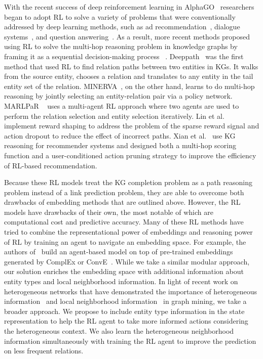 With the recent success of deep reinforcement learning in AlphaGO~\cite{silver2016mastering} researchers began to adopt RL to solve a variety of problems that were conventionally addressed by deep learning methods, such as ad recommendation~\cite{zheng2018drn,liu2018deep,chen2019top}, dialogue systems~\cite{serban2017deep,peng2017composite}, and question answering~\cite{xiong2017deeppath,das2017go}.  As a result, more recent methods proposed using RL to solve the multi-hop reasoning problem in knowledge graphs by framing it as a sequential decision-making process ~\cite{das2017go,shen2018reinforcewalk,xiong2017deeppath,shen2018m,li2018path,lin2018multi}. Deeppath~\cite{xiong2017deeppath} was the first method that used RL to find relation paths between two entities in KGs. It walks from the source entity, chooses a relation and translates to any entity in the tail entity set of the relation. MINERVA~\cite{das2017go}, on the other hand, learns to do multi-hop reasoning by jointly selecting an entity-relation pair via a policy network. MARLPaR ~\cite{li2018path} uses a multi-agent RL approach where two agents are used to perform the relation selection and entity selection iteratively. Lin et al. ~\cite{lin2018multi} implement reward shaping to address the problem of the sparse reward signal and action dropout to reduce the effect of incorrect paths. Xian et al.~\cite{xian2019reinforcement} use KG reasoning for recommender systems and designed both a multi-hop scoring function and a user-conditioned action pruning strategy to improve the efficiency of RL-based recommendation. 

Because these RL models treat the KG completion problem as a path reasoning problem instead of a link prediction problem, they are able to overcome both drawbacks of embedding methods that are outlined above. However, the RL models have drawbacks of their own, the most notable of which are computational cost and predictive accuracy. Many of these RL methods have tried to combine the representational power of embeddings and reasoning power of RL by training an agent to navigate an embedding space. For example, the authors of~\cite{lin2018multi} build an agent-based model on top of pre-trained embeddings generated by ComplEx\cite{trouillon2016complex} or ConvE~\cite{dettmers2018convolutional}. While we take a similar modular approach, our solution enriches the embedding space with additional information about entity types and local neighborhood information. 
In light of recent work on heterogeneous networks that have demonstrated the importance of heterogeneous information~\cite{dong2017metapath2vec,zhang2020learning,shen2020modeling,lei2019path} and local neighborhood information~\cite{xiong2018one,zhang2019few} in graph mining, we take a broader approach. We propose to include entity type information in the state representation to help the RL agent to take more informed actions considering the heterogeneous context. We also learn the heterogeneous neighborhood information simultaneously with training the RL agent to improve the prediction on less frequent relations. 


